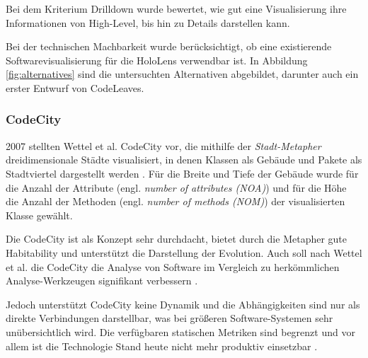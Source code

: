 Bei dem Kriterium Drilldown wurde bewertet, wie gut eine Visualisierung ihre Informationen von High-Level, bis hin zu Details darstellen kann.

Bei der technischen Machbarkeit wurde berücksichtigt, ob eine existierende Softwarevisualisierung für die HoloLens verwendbar ist. In Abbildung \ref{fig:alternatives} sind die untersuchten Alternativen abgebildet, darunter auch ein erster Entwurf von CodeLeaves.

\subsubsection*{CodeCity}
2007 stellten Wettel et al. CodeCity vor, die mithilfe der \textit{Stadt-Metapher} dreidimensionale Städte visualisiert, in denen Klassen als Gebäude und Pakete als Stadtviertel dargestellt werden \cite{wettel2007program, wettel2008visual, wettel2011software}. Für die Breite und Tiefe der Gebäude wurde für die Anzahl der Attribute (engl. \emph{number of attributes (NOA)}) und für die Höhe die Anzahl der Methoden (engl. \emph{number of methods (NOM)}) der visualisierten Klasse gewählt.

Die CodeCity ist als Konzept sehr durchdacht, bietet durch die Metapher gute Habitability und unterstützt die Darstellung der Evolution. Auch soll nach Wettel et al. die CodeCity die Analyse von Software im Vergleich zu herkömmlichen Analyse-Werkzeugen signifikant verbessern \cite{wettel2011software}.

Jedoch unterstützt CodeCity keine Dynamik und die Abhängigkeiten sind nur als direkte Verbindungen darstellbar, was bei größeren Software-Systemen sehr unübersichtlich wird. Die verfügbaren statischen Metriken sind begrenzt und vor allem ist die Technologie Stand heute nicht mehr produktiv einsetzbar \cite{puetz2017softwarevisualisierung}.

